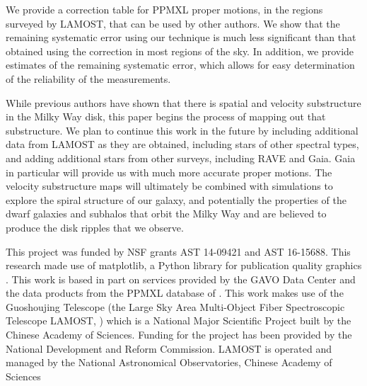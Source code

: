 \documentclass[11pt,preprint]{aastex6}
\begin{document}
We provide a correction table for PPMXL proper motions, in the regions surveyed by LAMOST, that can be used by other authors.  We show that the remaining systematic error using our technique is much less significant than that obtained using the \citet{Vickers2016} correction in most regions of the sky.  In addition, we provide estimates of the remaining systematic error, which allows for easy determination of the reliability of the measurements.

While previous authors have shown that there is spatial and velocity substructure in the Milky Way disk, this paper begins the process of mapping out that substructure.  We plan to continue this work in the future by including additional data from LAMOST as they are obtained, including stars of other spectral types, and adding additional stars from other surveys, including RAVE and Gaia.  Gaia in particular will provide us with much more accurate proper motions.  The velocity substructure maps will ultimately be combined with simulations to explore the spiral structure of our galaxy, and potentially the properties of the dwarf galaxies and subhalos that orbit the Milky Way and are believed to produce the disk ripples that we observe.

\acknowledgements

This project was funded by NSF grants AST 14-09421 and AST 16-15688.
This research made use of matplotlib, a Python library for publication quality graphics \citep{Hunter2007}.
This work is based in part on services provided by the GAVO Data Center and the data products from the PPMXL database of \citet{Roeser2010}.
This work makes use of the Guoshoujing Telescope (the Large Sky Area Multi-Object Fiber Spectroscopic Telescope LAMOST, \citealt{Cui2012}) which is a National Major Scientific Project built by the Chinese Academy of Sciences. Funding for the project has been provided by the National Development and Reform Commission. LAMOST is operated and managed by the National Astronomical Observatories, Chinese Academy of Sciences





\end{document}
